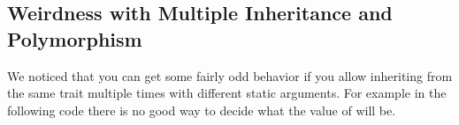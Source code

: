 \subsection{Weirdness with Multiple Inheritance and Polymorphism}

We noticed that you can get some fairly odd behavior if you allow inheriting from the same trait multiple times with different static arguments.  For example in the following code there is no good way to decide what the value of  will be.







